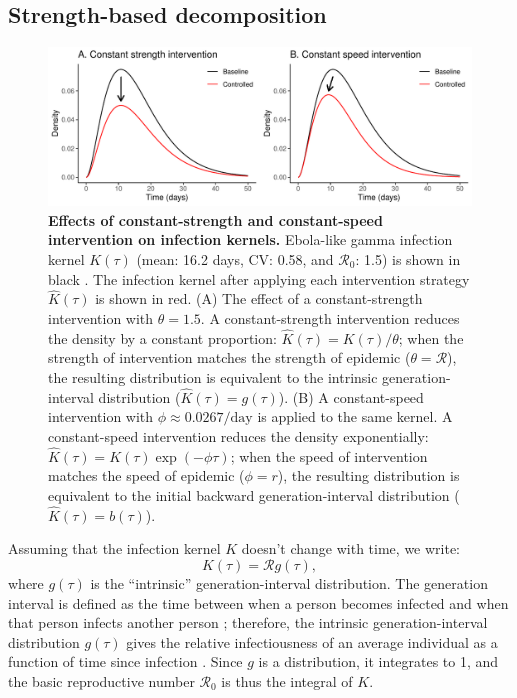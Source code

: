 \documentclass[12pt]{article}
\newcommand{\Rx}[1]{\ensuremath{{\mathcal R}_{#1}}}
\newcommand{\Ro}{\Rx{0}}
\newcommand{\RR}{\ensuremath{{\mathcal R}}}
\newcommand{\figlab}[1]{\label{fig:#1}}
\newcommand{\eqlab}[1]{\label{eq:#1}}
\begin{document}
\subsection{Strength-based decomposition}

\begin{figure}[!t]
\includegraphics[width=\textwidth]{../figure/constant_intervention.pdf}
\caption{
\textbf{Effects of constant-strength and constant-speed intervention on infection kernels.}
Ebola-like gamma infection kernel $K(\tau)$ (mean: 16.2 days, CV: 0.58, and \Ro: 1.5) is shown in black \citep{park2019practical}.
The infection kernel after applying each intervention strategy $\hat K(\tau)$ is shown in red.
(A) The effect of a constant-strength intervention with $\theta = 1.5$.
A constant-strength intervention reduces the density by a constant proportion: $\hat K(\tau) = K(\tau)/\theta$; when the strength of intervention matches the strength of epidemic ($\theta = \mathcal R$), the resulting distribution is equivalent to the intrinsic generation-interval distribution ($\hat K(\tau) = g(\tau)$).
(B) A constant-speed intervention with $\phi \approx 0.0267/\mathrm{day}$ is applied to the same kernel.
A constant-speed intervention reduces the density exponentially: $\hat K(\tau) = K(\tau) \exp(-\phi \tau)$; when the speed of intervention matches the speed of epidemic ($\phi = r$), the resulting distribution is equivalent to the initial backward generation-interval distribution ($\hat K(\tau) = b(\tau)$). 
}
\figlab{constant}
\end{figure}

Assuming that the infection kernel $K$ doesn't change with time, we write:
\begin{equation}
	K(\tau) = \RR g(\tau),
	\eqlab{strengthFactors}
\end{equation}
where $g(\tau)$ is the ``intrinsic'' generation-interval distribution.
The generation interval is defined as the time between when a person becomes infected and when that person infects another person \citep{svensson2007note};
therefore, the intrinsic generation-interval distribution $g(\tau)$ gives the relative infectiousness of an average individual as a function of time since infection \citep{champredon2015intrinsic}. 
Since $g$ is a distribution, it integrates to 1, and the basic reproductive number $\Ro$ is thus the integral of $K$.
\end{document}
